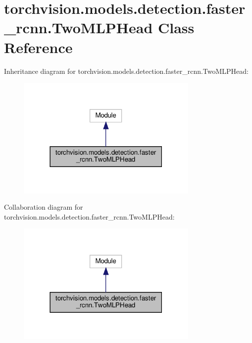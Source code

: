 \hypertarget{classtorchvision_1_1models_1_1detection_1_1faster__rcnn_1_1TwoMLPHead}{}\section{torchvision.\+models.\+detection.\+faster\+\_\+rcnn.\+Two\+M\+L\+P\+Head Class Reference}
\label{classtorchvision_1_1models_1_1detection_1_1faster__rcnn_1_1TwoMLPHead}


Inheritance diagram for torchvision.\+models.\+detection.\+faster\+\_\+rcnn.\+Two\+M\+L\+P\+Head\+:
\nopagebreak
\begin{figure}[H]
\begin{center}
\leavevmode
\includegraphics[width=249pt]{classtorchvision_1_1models_1_1detection_1_1faster__rcnn_1_1TwoMLPHead__inherit__graph}
\end{center}
\end{figure}


Collaboration diagram for torchvision.\+models.\+detection.\+faster\+\_\+rcnn.\+Two\+M\+L\+P\+Head\+:
\nopagebreak
\begin{figure}[H]
\begin{center}
\leavevmode
\includegraphics[width=249pt]{classtorchvision_1_1models_1_1detection_1_1faster__rcnn_1_1TwoMLPHead__coll__graph}
\end{center}
\end{figure}
